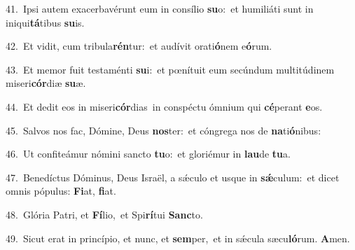 {\numbfont\textcolor{\numbcolor}{41.}}~Ipsi autem exacerbavérunt eum in consílio \textbf{su}\-o:~\star et humiliáti sunt in iniqui\-\textbf{tá}\-tibus \textbf{su}\-is.\par
{\numbfont\textcolor{\numbcolor}{42.}}~Et vidit, cum tribula\-\textbf{rén}\-tur:~\star et audívit orati\-\textbf{ó}\-nem e\-\textbf{ó}\-rum.\par
{\numbfont\textcolor{\numbcolor}{43.}}~Et memor fuit testaménti \textbf{su}\-i:~\star et pœnítuit eum secúndum multitúdinem miseri\-\textbf{cór}\-diæ \textbf{su}\-æ.\par
{\numbfont\textcolor{\numbcolor}{44.}}~Et dedit eos in miseri\-\textbf{cór}\-dias~\star in conspéctu ómnium qui \textbf{cé}\-perant \textbf{e}\-os.\par
{\numbfont\textcolor{\numbcolor}{45.}}~Salvos nos fac, Dómine, Deus \textbf{nos}\-ter:~\star et cóngrega nos de \textbf{na}\-ti\-\textbf{ó}\-nibus:\par
{\numbfont\textcolor{\numbcolor}{46.}}~Ut confiteámur nómini sancto \textbf{tu}\-o:~\star et gloriémur in \textbf{lau}\-de \textbf{tu}\-a.\par
{\numbfont\textcolor{\numbcolor}{47.}}~Benedíctus Dóminus, Deus Israël, a sǽculo et usque in \textbf{sǽ}\-culum:~\star et dicet omnis pópulus: \textbf{Fi}\-at, \textbf{fi}\-at.\par
{\numbfont\textcolor{\numbcolor}{48.}}~Glória Patri, et \textbf{Fí}\-lio,~\star et Spi\-\textbf{rí}\-tui \textbf{Sanc}\-to.\par
{\numbfont\textcolor{\numbcolor}{49.}}~Sicut erat in princípio, et nunc, et \textbf{sem}\-per,~\star et in sǽcula sæcu\-\textbf{ló}\-rum. \textbf{A}\-men.\par
